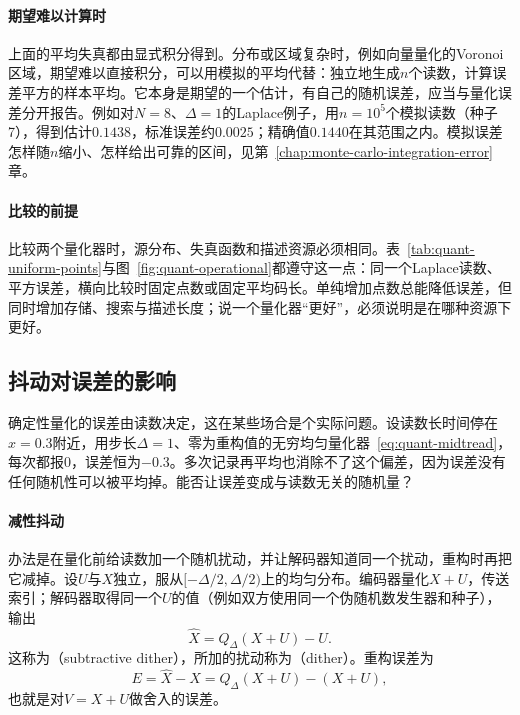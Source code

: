 \paragraph{期望难以计算时}
上面的平均失真都由显式积分得到。分布或区域复杂时，例如向量量化的Voronoi区域，期望难以直接积分，可以用模拟的平均代替：独立地生成$n$个读数，计算误差平方的样本平均。它本身是期望的一个估计，有自己的随机误差，应当与量化误差分开报告。例如对$N=8$、$\Delta=1$的Laplace例子，用$n=10^{5}$个模拟读数（种子7），得到估计$0.1438$，标准误差约$0.0025$；精确值$0.1440$在其范围之内。模拟误差怎样随$n$缩小、怎样给出可靠的区间，见第~\ref{chap:monte-carlo-integration-error}章。

\paragraph{比较的前提}
比较两个量化器时，源分布、失真函数和描述资源必须相同。表~\ref{tab:quant-uniform-points}与图~\ref{fig:quant-operational}都遵守这一点：同一个Laplace读数、平方误差，横向比较时固定点数或固定平均码长。单纯增加点数总能降低误差，但同时增加存储、搜索与描述长度；说一个量化器“更好”，必须说明是在哪种资源下更好。

\subsection{抖动对误差的影响}
\label{sec:quant-dither}

确定性量化的误差由读数决定，这在某些场合是个实际问题。设读数长时间停在$x=0.3$附近，用步长$\Delta=1$、零为重构值的无穷均匀量化器~\eqref{eq:quant-midtread}，每次都报$0$，误差恒为$-0.3$。多次记录再平均也消除不了这个偏差，因为误差没有任何随机性可以被平均掉。能否让误差变成与读数无关的随机量？

\paragraph{减性抖动}
办法是在量化前给读数加一个随机扰动，并让解码器知道同一个扰动，重构时再把它减掉。设$U$与$X$独立，服从$[-\Delta/2,\Delta/2)$上的均匀分布。编码器量化$X+U$，传送索引；解码器取得同一个$U$的值（例如双方使用同一个伪随机数发生器和种子），输出
\begin{equation}
 \hat{X}=Q_{\Delta}(X+U)-U .
 \label{eq:quant-subtractive-dither}
\end{equation}
这称为（subtractive dither），所加的扰动称为（dither）。重构误差为
\[
 E=\hat{X}-X=Q_{\Delta}(X+U)-(X+U) ,
\]
也就是对$V=X+U$做舍入的误差。

